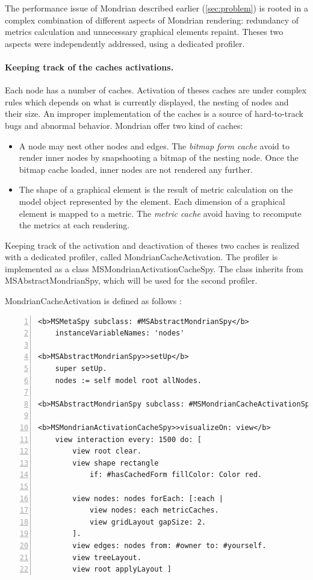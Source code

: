 \documentclass[runningheads]{llncs}
\newcommand{\ab}[1]{\nb{Alexandre}{blue}{#1}}
\newcommand{\lr}[1]{\nb{Lukas}{orange}{#1}}
\newcommand{\jr}[1]{\nb{Jorge}{cyan}{#1}}
\newcommand{\co}[1]{{\sf #1}}
\begin{document}

The performance issue of Mondrian described earlier (\autoref{sec:problem}) is rooted in a complex combination of different aspects of Mondrian rendering: redundancy of metrics calculation and unnecessary graphical elements repaint. Theses two aspects were independently addressed, using a dedicated profiler.

\paragraph{Keeping track of the caches activations.}
Each node has a number of caches. Activation of theses caches are under complex rules which depends on what is currently displayed, the nesting of nodes and their size. An improper implementation of the caches is a source of hard-to-track bugs and abnormal behavior. Mondrian offer two kind of caches:
\begin{itemize}
\item A node may nest other nodes and edges. The \emph{bitmap form cache} avoid to render inner nodes by snapshooting a bitmap of the nesting node. Once the bitmap cache loaded, inner nodes are not rendered any further.
\item The shape of a graphical element is the result of metric calculation on the model object represented by the element. Each dimension of a graphical element is mapped to a metric. The \emph{metric cache} avoid having to recompute the metrics at each rendering.
\end{itemize}

Keeping track of the activation and deactivation of theses two caches is realized with a dedicated profiler, called {\sc MondrianCacheActivation}. The profiler is implemented as a class \co{MSMondrianActivationCacheSpy}. The class inherits from \co{MSAbstractMondrianSpy}, which will be used for the second profiler.

{\sc MondrianCacheActivation} is defined as follows \lr{what does this demonstrate?}:

\begin{lstlisting}[numbers=left]
<b>MSMetaSpy subclass: #MSAbstractMondrianSpy</b>
	instanceVariableNames: 'nodes'
	
<b>MSAbstractMondrianSpy>>setUp</b>
	super setUp.
	nodes := self model root allNodes.
	
<b>MSAbstractMondrianSpy subclass: #MSMondrianCacheActivationSpy</b>

<b>MSMondrianActivationCacheSpy>>visualizeOn: view</b>
	view interaction every: 1500 do: [
		view root clear.
		view shape rectangle
			if: #hasCachedForm fillColor: Color red.

		view nodes: nodes forEach: [:each |
			view nodes: each metricCaches.
			view gridLayout gapSize: 2.
		].  
		view edges: nodes from: #owner to: #yourself.
		view treeLayout.
		view root applyLayout ]
\end{lstlisting}
\end{document}
